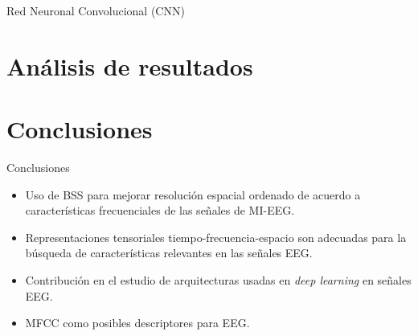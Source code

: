 \documentclass[10pt]{beamer}
\begin{document}
\begin{frame}{Red Neuronal Convolucional (CNN)}
\begin{table}[h]
\caption{Comparación con otros trabajos reportados que usan la misma base de datos.}
\label{works}
\end{table}
 
 
 
    
\end{frame}






\section{Análisis de resultados}


\section{Conclusiones}

\begin{frame}{Conclusiones}

\begin{itemize}

    \item Uso de BSS para mejorar resolución espacial ordenado de acuerdo a características frecuenciales de las señales de MI-EEG.
    \item Representaciones tensoriales tiempo-frecuencia-espacio son adecuadas para la búsqueda de características relevantes en las señales EEG. 
    \item Contribución en el estudio de arquitecturas usadas en \textit{deep learning} en señales EEG.
    \item MFCC como posibles descriptores para EEG.
\end{itemize}
    
\end{frame}
\end{document}

